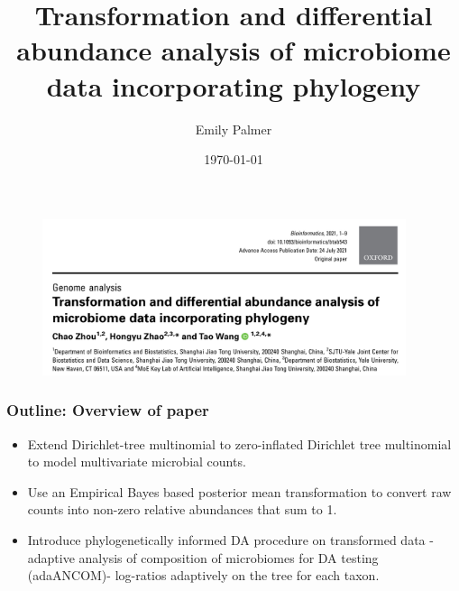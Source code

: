 \documentclass{beamer}
\title[Journal Club]{Transformation and differential abundance analysis of microbiome data incorporating phylogeny} %
\author{Emily Palmer} %
\institute[OSU] %
  {Oregon State University \\ %
    \medskip
    \textit{palmerem@oregonstate.edu} %
  }
\date{\today} %
\begin{document}
  \begin{frame}
  \titlepage %
  \end{frame}



  \begin{frame}
  \begin{figure}[!htb]
	\centering
	\includegraphics[width=0.95\textwidth]{img/paper_title.png}
\end{figure}
\end{frame}

\begin{frame}
\frametitle{Outline: Overview of paper}
 \begin{itemize}
   \item Extend Dirichlet-tree multinomial to zero-inflated Dirichlet tree multinomial to model multivariate microbial counts.
   \item Use an Empirical Bayes based posterior mean transformation to convert raw counts into non-zero relative abundances that sum to 1.
   \item Introduce phylogenetically informed DA procedure on transformed data - adaptive analysis of composition of microbiomes for DA testing (adaANCOM)- log-ratios adaptively on the tree for each taxon.
 \end{itemize}
\end{frame}
\end{document}
